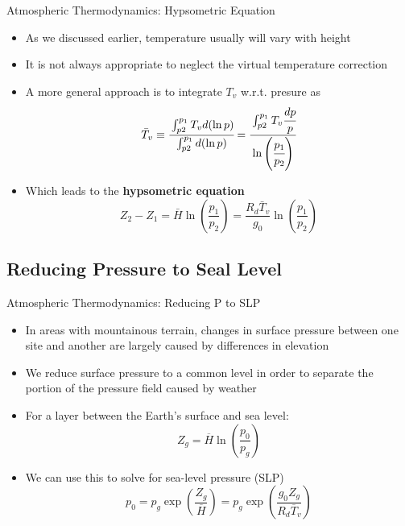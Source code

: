 
\begin{frame}{Atmospheric Thermodynamics: Hypsometric Equation}
\begin{itemize}
	\item As we discussed earlier, temperature usually will vary with height
	\item It is not always appropriate to neglect the virtual temperature correction
	\item A more general approach is to integrate $T_v$ w.r.t. presure as 
	$$\bar T_v \equiv \cfrac{\int^{p_1}_{p2} T_v d(\ln{p})}{\int^{p_1}_{p2} d(\ln{p})} = \cfrac{\int^{p_1}_{p2} T_v \cfrac{dp}{p}}{\ln{\left(\cfrac{p_1}{p_2}\right)}}$$
	\item Which leads to the \textbf{hypsometric equation}
	$$Z_2 - Z_1 = \bar H\ln\left(\frac{p_1}{p_2}\right) = \frac{R_d\bar T_v}{g_0}\ln\left(\frac{p_1}{p_2}\right)$$
\end{itemize}
\end{frame}

\subsection{Reducing Pressure to Seal Level}

\begin{frame}{Atmospheric Thermodynamics: Reducing P to SLP}
\begin{itemize}
	\item In areas with mountainous terrain, changes in surface pressure between one site and another are largely caused by differences in elevation
	\item We reduce surface pressure to a common level in order to separate the portion of the pressure field caused by weather
	\item  For a layer between the Earth's surface and sea level:
	$$Z_g = \overline{H}\ln{\left(\frac{p_0}{p_g}\right)}$$
	\item We can use this to solve for sea-level pressure (SLP)
	$$p_0 = p_g\exp{\left(\frac{Z_g}{\overline{H}}\right)} = p_g \exp{\left(\frac{g_0Z_g}{R_d\overline{T}_v}\right)}$$
\end{itemize}
\end{frame}


